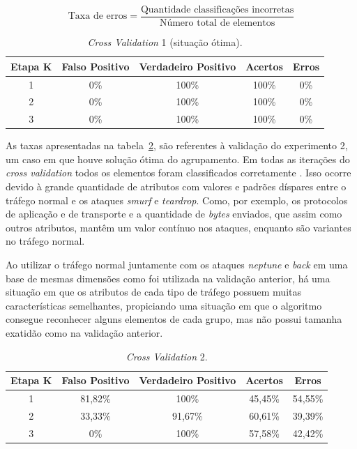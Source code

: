 \vspace{0.3cm}
\begin{equation}
\label{eq:Erros} %
\textrm{Taxa de erros} = \frac{\textrm{Quantidade classificações incorretas}}{\textrm{Número total de elementos}}
\end{equation}
\vspace{0cm}

\begin{table}[h]
\centering
\caption{\textit{Cross Validation} 1 (situação ótima).}
\vspace{0.5cm}
\begin{tabular}{|c|c|c|c|c|}
\hline
\textbf{Etapa K} & \textbf{Falso Positivo} & \textbf{Verdadeiro Positivo} & \textbf{Acertos} & \textbf{Erros}\\
\hline
1 & 0\% & 100\% & 100\% & 0\% \\
\hline
2 & 0\% & 100\% & 100\% & 0\%\\
\hline
3 & 0\% & 100\% & 100\%& 0\%\\
\hline
\end{tabular}
\label{tab5}
\end{table}

\indent As taxas apresentadas na tabela~\ref{tabela6}, são referentes à validação do experimento 2, um caso em que houve solução ótima do agrupamento. Em todas as iterações do \textit{cross validation} todos os elementos foram classificados corretamente . Isso ocorre devido à grande quantidade de atributos com valores e padrões díspares entre o tráfego normal e os ataques \textit{smurf} e \textit{teardrop}. Como, por exemplo, os protocolos de aplicação e de transporte e a quantidade de \textit{bytes} enviados, que assim como outros atributos, mantêm um valor contínuo nos ataques, enquanto são variantes no tráfego normal.

\indent Ao utilizar o tráfego normal juntamente com os ataques \textit{neptune} e \textit{back} em uma base de mesmas dimensões como foi utilizada na validação anterior, há uma situação em que os atributos de cada tipo de tráfego possuem muitas características semelhantes, propiciando uma situação em que o algoritmo consegue reconhecer alguns elementos de cada grupo, mas não possui tamanha exatidão como na validação anterior.

\begin{table}[h]
\centering
\caption{\textit{Cross Validation} 2.}
\label{tabela6}
\vspace{0.5cm}
\begin{tabular}{|c|c|c|c|c|}
\hline
\textbf{Etapa K} & \textbf{Falso Positivo} & \textbf{Verdadeiro Positivo} & \textbf{Acertos} & \textbf{Erros}\\
\hline
1 & 81,82\% & 100\% & 45,45\% & 54,55\% \\
\hline
2 & 33,33\% & 91,67\% & 60,61\% & 39,39\%\\
\hline
3 & 0\% & 100\% & 57,58\% & 42,42\%\\
\hline
\end{tabular}
\end{table}

